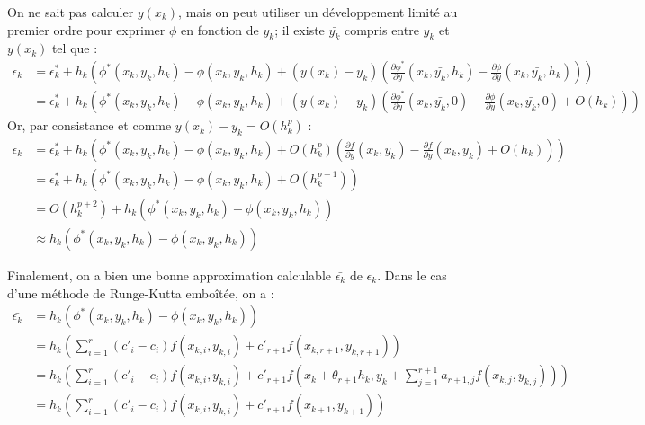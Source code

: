 \documentclass[a4paper, titlepage]{livret} %
\begin{document}
				On ne sait pas calculer $y(x_{k})$, mais on peut utiliser un développement limité au premier ordre pour exprimer $\phi$ en fonction de $y_{k}$; il existe $\bar{y_{k}}$ compris entre $y_{k}$ et $y(x_{k})$ tel que :
				\[
				\begin{aligned}
					\epsilon_{k} & = \epsilon_{k}^{*} + h_{k}\left(\phi^{*}(x_{k}, y_{k}, h_{k}) - \phi(x_{k}, y_{k}, h_{k}) + (y(x_{k}) - y_{k})\left(\frac{\partial \phi^{*}}{\partial y}(x_{k}, \bar{y_{k}}, h_{k}) - \frac{\partial \phi}{\partial y}(x_{k}, \bar{y_{k}}, h_{k})\right)\right) \\
								 & = \epsilon_{k}^{*} + h_{k}\left(\phi^{*}(x_{k}, y_{k}, h_{k}) - \phi(x_{k}, y_{k}, h_{k}) + (y(x_{k}) - y_{k})\left(\frac{\partial \phi^{*}}{\partial y}(x_{k}, \bar{y_{k}}, 0) - \frac{\partial \phi}{\partial y}(x_{k}, \bar{y_{k}}, 0) + O(h_{k})\right)\right)
				\end{aligned}
				\]
				Or, par consistance et comme $y(x_{k}) - y_{k} = O(h_{k}^{p})$ :
				\[
				\begin{aligned}
					\epsilon_{k} & = \epsilon_{k}^{*} + h_{k}\left(\phi^{*}(x_{k}, y_{k}, h_{k}) - \phi(x_{k}, y_{k}, h_{k}) + O(h_{k}^{p})\left(\frac{\partial f}{\partial y}(x_{k}, \bar{y_{k}}) - \frac{\partial f}{\partial y}(x_{k}, \bar{y_{k}}) + O(h_{k})\right)\right) \\
								 & = \epsilon_{k}^{*} + h_{k}\left(\phi^{*}(x_{k}, y_{k}, h_{k}) - \phi(x_{k}, y_{k}, h_{k}) + O(h_{k}^{p+1})\right) \\
								 & = O(h_{k}^{p+2}) + h_{k}\left(\phi^{*}(x_{k}, y_{k}, h_{k}) - \phi(x_{k}, y_{k}, h_{k})\right)\\
								 & \approx h_{k}\left(\phi^{*}(x_{k}, y_{k}, h_{k}) - \phi(x_{k}, y_{k}, h_{k})\right)
				\end{aligned}
				\]

				Finalement, on a bien une bonne approximation calculable $\bar{\epsilon_{k}}$ de $\epsilon_{k}$.
				Dans le cas d'une méthode de Runge-Kutta emboîtée, on a :
				\[
				\begin{aligned}
					\bar{\epsilon_{k}} & = h_{k}\left(\phi^{*}(x_{k}, y_{k}, h_{k}) - \phi(x_{k}, y_{k}, h_{k})\right)\\
								 		 & = h_{k}\left(\sum_{i = 1}^{r} (c'_{i} - c_{i})f(x_{k,i}, y_{k,i}) + c'_{r+1}f(x_{k,r+1}, y_{k,r+1})\right)\\
								 		 & = h_{k}\left(\sum_{i = 1}^{r} (c'_{i} - c_{i})f(x_{k,i}, y_{k,i}) + c'_{r+1}f\left(x_{k} + \theta_{r+1}h_{k}, y_{k} + \sum_{j=1}^{r+1}a_{r+1,j}f(x_{k,j}, y_{k,j})\right)\right)\\
								 		 & = h_{k}\left(\sum_{i = 1}^{r} (c'_{i} - c_{i})f(x_{k,i}, y_{k,i}) + c'_{r+1}f(x_{k+1}, y_{k+1})\right)
				\end{aligned}
				\]
				
\end{document}
